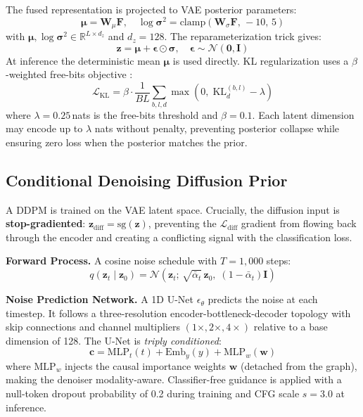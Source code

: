 \documentclass[conference]{IEEEtran}
\begin{document}
The fused representation is projected to VAE posterior parameters:
\begin{equation}
    \boldsymbol{\mu} = \mathbf{W}_\mu \mathbf{F}, \quad
    \log\boldsymbol{\sigma}^2 = \mathrm{clamp}(\mathbf{W}_\sigma \mathbf{F},\,-10,\,5)
\end{equation}
with $\boldsymbol{\mu}, \log\boldsymbol{\sigma}^2 \in \mathbb{R}^{L \times d_z}$
and $d_z = 128$.  The reparameterization trick gives:
\begin{equation}
    \mathbf{z} = \boldsymbol{\mu} + \boldsymbol{\epsilon} \odot \boldsymbol{\sigma},
    \quad \boldsymbol{\epsilon} \sim \mathcal{N}(\mathbf{0}, \mathbf{I})
\end{equation}
At inference the deterministic mean $\boldsymbol{\mu}$ is used directly.  KL
regularization uses a $\beta$-weighted free-bits objective
\cite{kingma2016freebits}:
\begin{equation}
    \mathcal{L}_{\mathrm{KL}} = \beta \cdot \frac{1}{BL}
    \sum_{b,l,d} \max\!\left(0,\; \mathrm{KL}_d^{(b,l)} - \lambda\right)
\end{equation}
where $\lambda = 0.25$\,nats is the free-bits threshold and $\beta = 0.1$.
Each latent dimension may encode up to $\lambda$ nats without penalty, preventing
posterior collapse while ensuring zero loss when the posterior matches the prior.

\subsection{Conditional Denoising Diffusion Prior}
\label{sec:diffusion}

A DDPM \cite{ho2020ddpm} is trained on the VAE latent space.  Crucially, the
diffusion input is \textbf{stop-gradiented}: $\mathbf{z}_{\mathrm{diff}} =
\mathrm{sg}(\mathbf{z})$, preventing the $\mathcal{L}_{\mathrm{diff}}$
gradient from flowing back through the encoder and creating a conflicting
signal with the classification loss.

\textbf{Forward Process.}
A cosine noise schedule \cite{ho2020ddpm} with $T=1{,}000$ steps:
\begin{equation}
    q(\mathbf{z}_t \mid \mathbf{z}_0) = \mathcal{N}\!\left(\mathbf{z}_t;\,
    \sqrt{\bar{\alpha}_t}\,\mathbf{z}_0,\; (1-\bar{\alpha}_t)\mathbf{I}\right)
\end{equation}

\textbf{Noise Prediction Network.}
A 1D U-Net $\epsilon_\theta$ predicts the noise at each timestep.  It follows
a three-resolution encoder-bottleneck-decoder topology with skip connections
and channel multipliers $(1\times, 2\times, 4\times)$ relative to a base
dimension of 128.  The U-Net is \emph{triply conditioned}:
\begin{equation}
    \mathbf{c} = \mathrm{MLP}_t(t) + \mathrm{Emb}_y(y) + \mathrm{MLP}_w(\mathbf{w})
\end{equation}
where $\mathrm{MLP}_w$ injects the causal importance weights $\mathbf{w}$
(detached from the graph), making the denoiser modality-aware.
Classifier-free guidance \cite{ho2022cfg} is applied with a null-token dropout
probability of 0.2 during training and CFG scale $s=3.0$ at inference.
\end{document}
